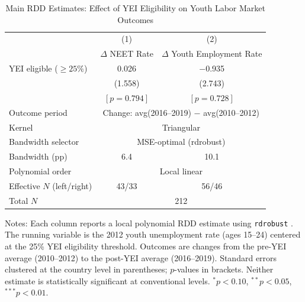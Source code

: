 \begin{table}[h!]
\centering
\caption{Main RDD Estimates: Effect of YEI Eligibility on Youth Labor Market Outcomes}
\label{tab:rdd_main}
\begin{tabular}{lcc}
\toprule
 & (1) & (2) \\
 & $\Delta$ NEET Rate & $\Delta$ Youth Employment Rate \\
\midrule
YEI eligible ($\geq 25\%$) & 0.026 & $-$0.935 \\
 & (1.558) & (2.743) \\
 & $[p = 0.794]$ & $[p = 0.728]$ \\
\midrule
Outcome period & \multicolumn{2}{c}{Change: avg(2016--2019) $-$ avg(2010--2012)} \\
Kernel & \multicolumn{2}{c}{Triangular} \\
Bandwidth selector & \multicolumn{2}{c}{MSE-optimal (rdrobust)} \\
Bandwidth (pp) & 6.4 & 10.1 \\
Polynomial order & \multicolumn{2}{c}{Local linear} \\
Effective $N$ (left/right) & 43/33 & 56/46 \\
Total $N$ & \multicolumn{2}{c}{212} \\
\bottomrule
\end{tabular}

\raggedright\footnotesize
Notes: Each column reports a local polynomial RDD estimate using \texttt{rdrobust} \citep{cattaneo2014robust}. The running variable is the 2012 youth unemployment rate (ages 15--24) centered at the 25\% YEI eligibility threshold. Outcomes are changes from the pre-YEI average (2010--2012) to the post-YEI average (2016--2019). Standard errors clustered at the country level in parentheses; $p$-values in brackets. Neither estimate is statistically significant at conventional levels. $^{*}p<0.10$, $^{**}p<0.05$, $^{***}p<0.01$.
\end{table}
